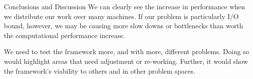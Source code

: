\begin{block}{\Large Conclusions and Discussion}
We can clearly see the increase in performance when we distribute our work over
many machines. If our problem is particularly I/O bound, however, we may be
causing more slow downs or bottlenecks than worth the computational performance
increase.\hfill{}\\{}

We need to test the framework more, and with more, different problems. Doing so
would highlight areas that need adjustment or re-working. Further, it would
show the framework's viability to others and in other problem spaces.
\end{block}
